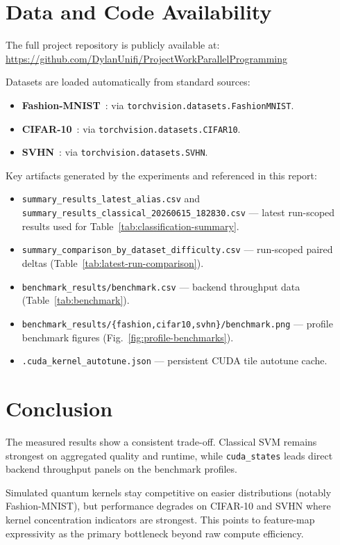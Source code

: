 \documentclass[10pt,twocolumn,letterpaper]{article}
\begin{document}
\section{Data and Code Availability}
The full project repository is publicly available at:\\{\small\url{https://github.com/DylanUnifi/ProjectWorkParallelProgramming}}

Datasets are loaded automatically from standard sources:
\begin{itemize}
    \item \textbf{Fashion-MNIST}~\cite{xiao2017fashion}: via \texttt{torchvision.datasets.FashionMNIST}.
    \item \textbf{CIFAR-10}~\cite{krizhevsky2009cifar}: via \texttt{torchvision.datasets.CIFAR10}.
    \item \textbf{SVHN}~\cite{netzer2011svhn}: via \texttt{torchvision.datasets.SVHN}.
\end{itemize}

Key artifacts generated by the experiments and referenced in this report:
\begin{itemize}
    \item \texttt{summary\_results\_latest\_alias.csv} and \texttt{summary\_results\_classical\_20260615\_182830.csv} — latest run-scoped results used for Table~\ref{tab:classification-summary}.
    \item \texttt{summary\_comparison\_by\_dataset\_difficulty.csv} — run-scoped paired deltas (Table~\ref{tab:latest-run-comparison}).
    \item \texttt{benchmark\_results/benchmark.csv} — backend throughput data (Table~\ref{tab:benchmark}).
    \item \texttt{benchmark\_results/\{fashion,cifar10,svhn\}/benchmark.png} — profile benchmark figures (Fig.~\ref{fig:profile-benchmarks}).
    \item \texttt{.cuda\_kernel\_autotune.json} — persistent CUDA tile autotune cache.
\end{itemize}

\section{Conclusion}
The measured results show a consistent trade-off. Classical SVM remains strongest on aggregated quality and runtime, while \texttt{cuda\_states} leads direct backend throughput panels on the benchmark profiles.

Simulated quantum kernels stay competitive on easier distributions (notably Fashion-MNIST), but performance degrades on CIFAR-10 and SVHN where kernel concentration indicators are strongest. This points to feature-map expressivity as the primary bottleneck beyond raw compute efficiency.
\end{document}

